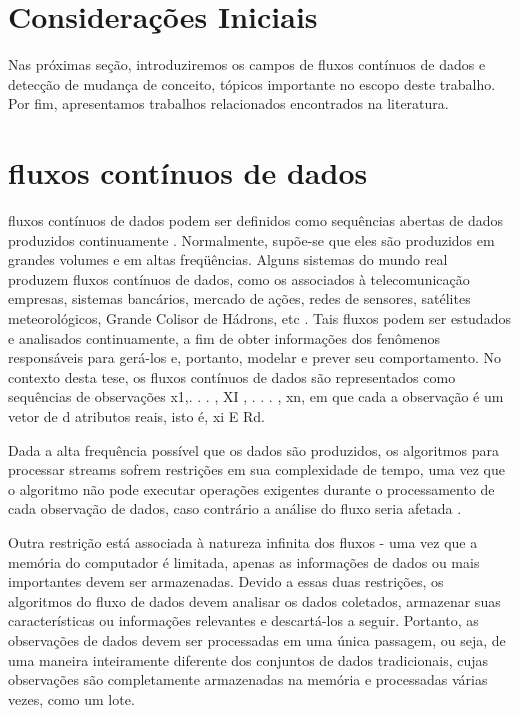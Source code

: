 \documentclass[qual, classic, a4paper]{ufbathesis}
\begin{document}
 \label{revisao_bibliografica}
\section{Considerações Iniciais}

Nas próximas seção, introduziremos os campos de fluxos contínuos de dados e detecção de mudança de conceito, tópicos importante no escopo deste trabalho. Por fim, apresentamos trabalhos relacionados encontrados na literatura.

\section{fluxos contínuos de dados}

fluxos contínuos de dados podem ser definidos como sequências abertas de dados produzidos continuamente \cite{Pavlidis:2011:9AC:1860144.1860487}.
Normalmente, supõe-se que eles são produzidos em grandes volumes e em altas freqüências. Alguns sistemas do mundo real produzem fluxos contínuos de dados, como os associados à telecomunicação empresas, sistemas bancários, mercado de ações, redes de sensores, satélites meteorológicos, Grande Colisor de Hádrons, etc \cite{Guha:2003:CDS:776752.776777}.
Tais fluxos podem ser estudados e analisados continuamente, a fim de obter informações dos fenômenos responsáveis para gerá-los e, portanto, modelar e prever seu comportamento. No contexto desta tese, os fluxos contínuos de dados são representados como sequências de observações x1,. . . , XI , . . . , xn, em que cada a observação é um vetor de d atributos reais, isto é, xi E Rd.

Dada a alta frequência possível que os dados são produzidos, os algoritmos para processar streams sofrem restrições em sua complexidade de tempo, uma vez que o algoritmo não pode executar operações exigentes durante o processamento de cada observação de dados, caso contrário a análise do fluxo seria afetada \cite{EDDM}.

Outra restrição está associada à natureza infinita dos fluxos - uma vez que a memória do computador é limitada, apenas as informações de dados ou mais importantes devem ser armazenadas. Devido a essas duas restrições, os algoritmos do fluxo de dados devem analisar os dados coletados, armazenar suas características ou informações relevantes e descartá-los a seguir. Portanto, as observações de dados devem ser processadas em uma única passagem, ou seja, de uma maneira inteiramente diferente dos conjuntos de dados tradicionais, cujas observações são completamente armazenadas na memória e processadas várias vezes, como um lote.
\end{document}
